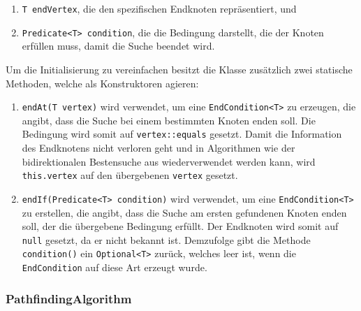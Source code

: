                 \begin{enumerate}
                    \item \lstinline{T endVertex}, die den spezifischen Endknoten repräsentiert, und
                    
                    \item \lstinline{Predicate<T> condition}, die die Bedingung darstellt, die der Knoten erfüllen muss, damit die Suche beendet wird.
                \end{enumerate}
                
                 Um die Initialisierung zu vereinfachen besitzt die Klasse zusätzlich zwei statische Methoden, welche als Konstruktoren agieren:

                \begin{enumerate}
                    \item \lstinline{endAt(T vertex)} wird verwendet, um eine \lstinline{EndCondition<T>} zu erzeugen, die angibt, dass die Suche bei einem bestimmten Knoten enden soll. Die Bedingung wird somit auf \lstinline{vertex::equals} gesetzt. Damit die Information des Endknotens nicht verloren geht und in Algorithmen wie der bidirektionalen Bestensuche aus  wiederverwendet werden kann, wird \lstinline{this.vertex} auf den übergebenen \lstinline{vertex} gesetzt.

                    \item \lstinline{endIf(Predicate<T> condition)} wird verwendet, um eine \lstinline{EndCondition<T>} zu erstellen, die angibt, dass die Suche am ersten gefundenen Knoten enden soll, der die übergebene Bedingung erfüllt. Der Endknoten wird somit auf \lstinline{null} gesetzt, da er nicht bekannt ist. Demzufolge gibt die Methode \lstinline{condition()} ein \lstinline{Optional<T>} zurück, welches leer ist, wenn die \lstinline{EndCondition} auf diese Art erzeugt wurde.
                \end{enumerate}

                

            \subsubsection{PathfindingAlgorithm}

